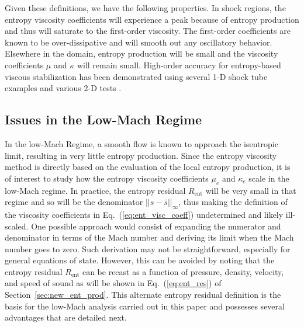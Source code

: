 \documentclass[review,10pt]{elsarticle}
\newcommand{\resi}{R_\text{ent}}
\newcommand{\eqt}[1]{Eq.~(\ref{#1})}                     %
\newcommand{\sct}[1]{Section~\ref{#1}}                   %
\begin{document}
%
Given these definitions, we have the following properties.
In shock regions, the entropy viscosity coefficients will experience a peak because of entropy production and thus 
will saturate to the first-order viscosity. The first-order coefficients are known to be over-dissipative and will 
smooth out any oscillatory behavior. Elsewhere in the domain, entropy production will be small and the viscosity 
coefficients $\mu$ and $\kappa$ will remain small. %
High-order accuracy for entropy-based viscous stabilization has been demonstrated using several 1-D shock tube 
examples and various 2-D tests \cite{jlg1, jlg2, valentin}.

\subsection{Issues in the Low-Mach Regime} 

In the low-Mach Regime, a smooth flow is known to approach the isentropic limit, resulting in very little 
entropy production. Since the entropy viscosity method is directly based on the evaluation of the 
local entropy production, it is of interest to study how the entropy viscosity coefficients $\mu_e$ 
and $\kappa_e$ scale in the low-Mach regime. In practice, the entropy residual $\resi$ will be very 
small in that regime and so will be the denominator $|| s - \bar{s} ||_\infty$, thus making the 
definition of the viscosity coefficients in \eqt{eq:ent_visc_coeff} undetermined and likely ill-scaled.  
One possible approach would consist of expanding the numerator and denominator in terms of the Mach number 
and deriving its limit when the Mach number goes to zero. Such derivation may not be straightforward, 
especially for general equations of state. However, this can be avoided by noting that the entropy 
residual $\resi$ can be recast as a function of pressure, density, velocity, and speed of sound as 
will be shown in \eqt{eq:ent_res} of \sct{sec:new_ent_prod}. This alternate entropy residual definition 
is the basis for the low-Mach analysis carried out in this paper and possesses several advantages that 
are detailed next. %

\end{document}
